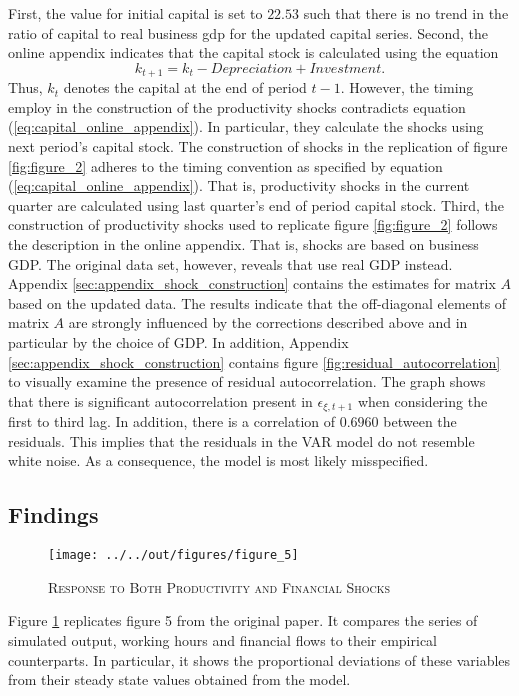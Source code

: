 First, the value for initial capital is set to $22.53$ such that there is no trend in the ratio of capital to real business gdp for the updated capital series. Second, the online appendix indicates that the capital stock is calculated using the equation
\begin{equation} 
\label{eq:capital_online_appendix}
k_{t+1} = k_{t} - Depreciation + Investment.
\end{equation} 
Thus, ${k}_t$ denotes the capital at the end of period $t-1$. However, the timing \citeauthor{JERMANNfinancial} employ in the construction of the productivity shocks contradicts equation (\ref{eq:capital_online_appendix}). In particular, they  calculate the shocks using next period's capital stock. The construction of shocks in the replication of figure \ref{fig:figure_2} adheres to the timing convention as specified by equation (\ref{eq:capital_online_appendix}). That is, productivity shocks in the current quarter are calculated using last quarter's end of period capital stock. Third, the construction of productivity shocks used to replicate figure \ref{fig:figure_2} follows the description in the online appendix. That is, shocks are based on business GDP. The original data set, however, reveals that \citeauthor{JERMANNfinancial} use real GDP instead. 
Appendix \ref{sec:appendix_shock_construction} contains the estimates for matrix $A$ based on the updated data. The results indicate that the off-diagonal elements of matrix $A$ are strongly influenced by the corrections described above and in particular by the choice of GDP. In addition, Appendix \ref{sec:appendix_shock_construction} contains figure \ref{fig:residual_autocorrelation} to visually examine the presence of residual autocorrelation. The graph shows that there is significant autocorrelation present in ${\epsilon}_{\xi,t+1}$ when considering the first to third lag. In addition, there is a correlation of $0.6960$ between the residuals. This implies that the residuals in the VAR model do not resemble white noise. As a consequence, the model is most likely misspecified.


\subsection{Findings}
\label{sec:findings}

\begin{figure}[t]
	\begin{center}
	    \texttt{[image: ../../out/figures/figure\_5]}
	    \caption{\textsc{Response to Both Productivity and Financial Shocks}}
	    \label{fig:figure_5}
    \end{center}
\end{figure}

Figure \ref{fig:figure_5} replicates figure 5 from the original paper. It compares  the series of simulated output, working hours and financial flows to their empirical counterparts. In particular, it shows the proportional deviations of these variables from their steady state values obtained from the model.
